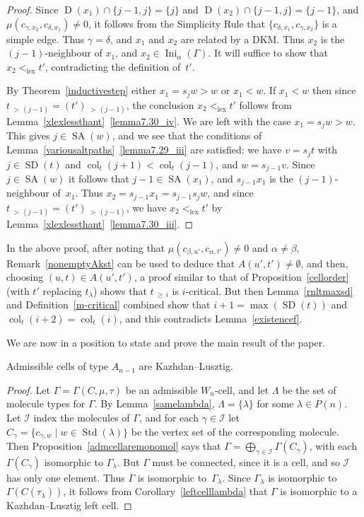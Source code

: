\documentclass[ALCO,ThmDefs,Unicode,epreuves]{cedram}
\DeclareMathOperator{\Ini}{Ini}
\DeclareMathOperator{\lex}{lex}
\DeclareMathOperator{\col}{col}
\newcommand{\morethan}[2]{#1\,{_{>\,#2}}}
\newcommand{\Morethan}[2]{#1\,{_{\geqslant\,#2}}}
\DeclareMathOperator{\STD}{Std}
\DeclareMathOperator{\SD}{SD}
\DeclareMathOperator{\SA}{SA}
\DeclareMathOperator{\D}{D}
\begin{document}
\begin{proof}
Since
$\D(x_1)\cap\{j-1,j\}=\{j\}$ and $\D(x_2)\cap\{j-1,j\}=\{j-1\}$,
and $\mu(c_{\gamma,x_2},c_{\delta,x_1})\neq 0$, it follows from the
Simplicity Rule
that $\{c_{\delta,x_1},c_{\gamma,x_2}\}$ is a simple edge.
Thus $\gamma=\delta$, and $x_1$ and $x_2$ are related by a DKM.
Thus $x_2$ is the $(j-1)$-neighbour of $x_1$, and $x_2\in\Ini_{\alpha}(\Gamma)$.
It will suffice to show that $x_2<_{\lex}t'$, contradicting the definition of~$t'$.

By Theorem~\ref{inductivestep} either $x_1=s_jw>w$ or $x_1<w$. If
$x_1<w$ then since $\morethan t{(j-1)}=\morethan {(t')}{(j-1)}$, the conclusion
$x_2<_{\lex}t'$ follows from Lemma~\ref{xlexlessthant}~\ref{lemma7.30_iv}.
We are left with the case $x_1=s_jw>w$. This gives $j\in\SA(w)$, and we see
that the conditions of Lemma~\ref{variousaltpaths}~\ref{lemma7.29_iii} are satisfied: we
have $v=s_jt$ with $j\in\SD(t)$ and $\col_t(j+1)<\col_t(j-1)$, and $w=s_{j-1}v$.
Since $j\in\SA(w)$ it follows that $j-1\in\SA(x_1)$, and $s_{j-1}x_1$
is the $(j-1)$-neighbour of~$x_1$. Thus $x_2=s_{j-1}x_1=s_{j-1}s_jw$, and
since $\morethan t{(j-1)}=\morethan {(t')}{(j-1)}$, we have
$x_2<_{\lex}t'$ by Lemma~\ref{xlexlessthant}~\ref{lemma7.30_iii}.
\end{proof}

\begin{rema}
In the above proof, after noting that
$\mu(c_{\beta,u'},c_{\alpha,t'})\neq 0$ and $\alpha\neq\beta$,
Remark~\ref{nonemptyAkst} can be used to deduce that $A(u',t')\neq\emptyset$, and
then, choosing $(u,t)\in A(u',t')$, a proof similar to that of
Proposition~\ref{cellorder} (with $t'$ replacing $t_\lambda$) shows
that $\Morethan ti$ is $i$-critical.
But then Lemma~\ref{rnltmaxsd} and Definition~\ref{m-critical} combined show that
$i+1=\max(\SD(t))$ and $\col_t(i+2)=\col_t(i)$, and this contradicts Lemma~\ref{existencef}.
\end{rema}

We are now in a position to state and prove the main result of the paper.
\begin{theo}\label{mainresult}
Admissible cells of type $A_{n-1}$ are Kazhdan--Lusztig.
\end{theo}

\begin{proof}
Let $\Gamma = \Gamma(C,\mu,\tau)$ be an admissible $W_n$-cell, and let
$\Lambda$ be the set of molecule types for $\Gamma$. By Lemma~\ref{samelambda},
$\Lambda=\{\lambda\}$ for some $\lambda\in P(n)$.
Let $\mathcal{I}$ index
the molecules of $\Gamma$, and for each $\gamma\in\mathcal{I}$ let
$C_{\gamma}= \{c_{\gamma,w}\mid w\in\STD(\lambda)\}$
be the vertex set of the corresponding molecule. Then Proposition~\ref{admcellaremonomol}
says that $\Gamma = \bigoplus_{\gamma\in\mathcal{I}}\Gamma(C_{\gamma})$,
with each $\Gamma(C_{\gamma})$
isomorphic to $\Gamma_{\lambda}$. But $\Gamma$ must be connected, since it
is a cell, and so $\mathcal{I}$ has only one element.
Thus $\Gamma$ is isomorphic to~$\Gamma_{\lambda}$.
Since $\Gamma_{\lambda}$ is isomorphic to $\Gamma(C(\tau_{\lambda}))$, it follows from
Corollary~\ref{leftcelllambda} that $\Gamma$ is isomorphic to a Kazhdan--Lusztig left cell.
\end{proof}
\end{document}
